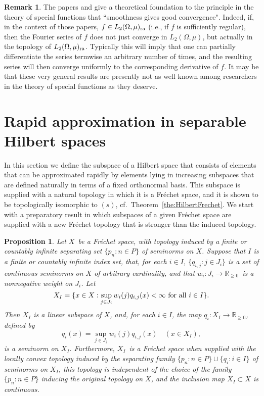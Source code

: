 \documentclass[12pt, reqno]{amsart}
\numberwithin{equation}{section}
\theoremstyle{plain}
\newtheorem{proposition}[theorem]{Proposition}
\theoremstyle{definition}
\newtheorem{remark}[theorem]{Remark}
\begin{document}
\begin{remark}
The papers \cite{Zerner} and \cite{Zeriahi} give a theoretical foundation to the principle in the theory of special functions that ``smoothness gives good convergence". Indeed, if, in the context of those papers, $f\in L_2(\Omega,\mu)_{\textup{ra}}$ (i.e., if $f$ is sufficiently regular), then the Fourier series of $f$ does not just converge in $L_2(\Omega,\mu)$, but actually in the topology of $L_2(\Omega,\mu)_{\textup{ra}}$. Typically this will imply that one can partially differentiate the series termwise an arbitrary number of times, and the resulting series will then converge uniformly to the corresponding derivative of $f$. It may be that these very general results are presently not as well known among researchers in the theory of special functions as they deserve.
\end{remark}

\section{Rapid approximation in separable Hilbert spaces}\label{sec:rapidapproximation}

In this section we define the subspace of a Hilbert space that consists of elements that can be approximated rapidly by elements lying in increasing subspaces that are defined naturally in terms of a fixed orthonormal basis. This subspace is supplied with a natural topology in which it is a Fr\'echet space, and it is shown to be topologically isomorphic to $(s)$, cf.\ Theorem~\ref{the:HilbertFrechet}.
We start with a preparatory result in which subspaces of a given Fr\'echet space are supplied with a new Fr\'echet topology that is stronger than the induced topology.

\begin{proposition}\label{prop:generalFrechet}
Let $X$\ be a Fr\'echet space, with topology induced by a finite or countably infinite separating set $\{p_n : n\in P\}$ of seminorms on $X$. Suppose that  $I$ is a finite or countably infinite index set, that, for each $i\in I$, $\{q_{i,j} : j\in J_i\}$ is a set of continuous seminorms on $X$ of arbitrary cardinality, and that $w_i: J_i\to\mathbb R_{\geq 0}$\ is a nonnegative weight on $J_i$. Let
\begin{equation*}
X_I=\{x\in X : \sup_{j\in J_i} w_i(j)q_{i,j}(x)<\infty\textup{ for all }i\in I\}.
\end{equation*}
Then $X_I$ is a linear subspace of $X$, and, for each $i\in I$, the map $q_i: X_I\to{{\mathbb R}}_{\geq 0}$, defined by
\begin{equation*}
q_i (x)=\sup_{j\in J_i} w_i(j)q_{i,j}(x)\quad(x\in X_I),
\end{equation*}
is a seminorm on $X_I$. Furthermore, $X_I$\ is a Fr\'echet space when supplied with the locally convex topology induced by the separating family $\{p_n : n\in P\}\cup \{q_i : i\in I\}$ of seminorms on $X_I$, this topology is independent of the choice of the family $\{p_n : n\in P\}$ inducing the original topology on $X$, and the inclusion map $X_I\subset X$ is continuous.
\end{proposition}
\end{document}
